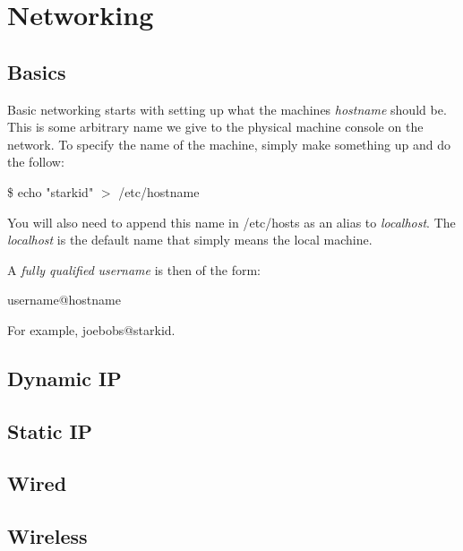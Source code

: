 
\section{Networking} %
\label{sec:networking}

\subsection{Basics}

Basic networking starts with setting up what the machines
\emph{hostname} should be. This is some arbitrary name we
give to the physical machine console on the network. To
specify the name of the machine, simply make something up
and do the follow:
\begin{center}
	\$ echo "starkid" $>$ /etc/hostname
\end{center}
You will also need to append this name in /etc/hosts as
an alias to \emph{localhost}. The \emph{localhost} is the
default name that simply means the local machine.

A \emph{fully qualified} \emph{username} is then of the form:
\begin{center}
	username@hostname
\end{center}
For example, joebobs@starkid.

\subsection{Dynamic IP}

\subsection{Static IP}

\subsection{Wired}

\subsection{Wireless}
